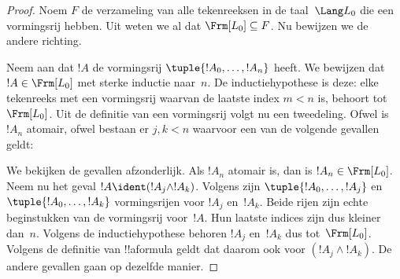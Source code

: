 \documentclass[../../../include/open-logic-section]{subfiles}
\begin{document}
\begin{proof}
  Noem $F$ de verzameling van alle tekenreeksen in de taal~$\Lang L_0$
  die een vormingsrij hebben. Uit
 weten we al dat
$\Frm[L_0] \subseteq F$. Nu bewijzen we de andere richting.

  Neem aan dat $!A$ de vormingsrij $\tuple{!A_0,\dotsc,!A_n}$ heeft. We
  bewijzen dat $!A \in \Frm[L_0]$ met sterke inductie naar~$n$. De
inductiehypothese is deze: elke tekenreeks met een vormingsrij waarvan
de laatste index $m < n$ is, behoort tot~$\Frm[L_0]$. Uit de definitie
van een vormingsrij volgt nu een tweedeling. Ofwel is $!A_n$ atomair,
ofwel bestaan er $j,k < n$ waarvoor een van de volgende gevallen
geldt:
\begin{enumerate}
\end{enumerate}
We bekijken de gevallen afzonderlijk. Als $!A_n$ atomair is, dan is
$!A_n \in \Frm[L_0]$. Neem nu het geval $!A \ident
(!A_j \land !A_k)$. Volgens  zijn
$\tuple{!A_0,\dotsc,!A_j}$ en $\tuple{!A_0,\dotsc,!A_k}$ vormingsrijen
voor $!A_j$ en~$!A_k$. Beide rijen zijn echte beginstukken van de
vormingsrij voor~$!A$. Hun laatste indices zijn dus kleiner dan~$n$.
Volgens de inductiehypothese behoren $!A_j$ en~$!A_k$ dus
  tot~$\Frm[L_0]$. Volgens de definitie van !!a{formula} geldt dat daarom
  ook voor $(!A_j \land !A_k)$. De andere gevallen gaan op
dezelfde manier.
\end{proof}
\end{document}
